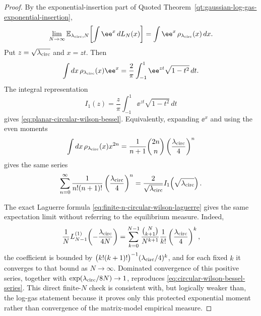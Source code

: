 \begin{proof}
By the exponential-insertion part of
Quoted Theorem~\ref{qt:gaussian-log-gas-exponential-insertion},
\[
  \lim_{N\to\infty}
  \mathbb E_{\lambda_{\rm circ},N}\!\left[\int\ee^x\,dL_N(x)\right]
  =
  \int\ee^x\,\rho_{\lambda_{\rm circ}}(x)\,dx .
\]
Put
\(z=\sqrt{\lambda_{\rm circ}}\) and \(x=zt\).  Then
\begin{equation}
  \int dx\,\rho_{\lambda_{\rm circ}}(x)\ee^x
  =
  \frac{2}{\pi}
  \int_{-1}^{1}\ee^{zt}\sqrt{1-t^2}\,dt .
  \label{eq:circular-wilson-bessel-integral-step}
\end{equation}
The integral representation
\begin{equation}
  I_1(z)
  =
  \frac{z}{\pi}
  \int_{-1}^{1}\ee^{zt}\sqrt{1-t^2}\,dt
  \label{eq:bessel-i1-semicircle-representation}
\end{equation}
gives \eqref{eq:planar-circular-wilson-bessel}.  Equivalently, expanding
\(\ee^x\) and using the even moments
\begin{equation}
  \int dx\,\rho_{\lambda_{\rm circ}}(x)x^{2n}
  =
  \frac{1}{n+1}\binom{2n}{n}
  \left(\frac{\lambda_{\rm circ}}{4}\right)^n
  \label{eq:circular-wilson-semicircle-moments}
\end{equation}
gives the same series
\begin{equation}
  \sum_{n=0}^{\infty}
  \frac1{n!(n+1)!}
  \left(\frac{\lambda_{\rm circ}}{4}\right)^n
  =
  \frac{2}{\sqrt{\lambda_{\rm circ}}}
  I_1\!\left(\sqrt{\lambda_{\rm circ}}\right).
  \label{eq:circular-wilson-bessel-series}
\end{equation}

The exact Laguerre formula
\eqref{eq:finite-n-circular-wilson-laguerre} gives the same expectation limit
without referring to the equilibrium measure.  Indeed,
\[
  \frac1N L_{N-1}^{(1)}
  \!\left(-\frac{\lambda_{\rm circ}}{4N}\right)
  =
  \sum_{k=0}^{N-1}
  \frac{\binom{N}{k+1}}{N^{k+1}}
  \frac1{k!}
  \left(\frac{\lambda_{\rm circ}}4\right)^k ,
\]
the coefficient is bounded by
\(\bigl(k!(k+1)!\bigr)^{-1}(\lambda_{\rm circ}/4)^k\), and for each fixed
\(k\) it converges to that bound as \(N\to\infty\).  Dominated convergence of
this positive series, together with
\(\exp(\lambda_{\rm circ}/8N)\to1\), reproduces
\eqref{eq:circular-wilson-bessel-series}.  This direct finite-\(N\) check is
consistent with, but logically weaker than, the log-gas statement because it
proves only this protected exponential moment rather than convergence of the
matrix-model empirical measure.
\end{proof}


